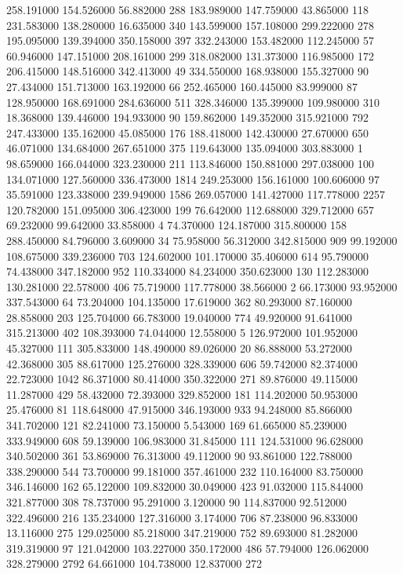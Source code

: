 258.191000	154.526000	56.882000	288
183.989000	147.759000	43.865000	118
231.583000	138.280000	16.635000	340
143.599000	157.108000	299.222000	278
195.095000	139.394000	350.158000	397
332.243000	153.482000	112.245000	57
60.946000	147.151000	208.161000	299
318.082000	131.373000	116.985000	172
206.415000	148.516000	342.413000	49
334.550000	168.938000	155.327000	90
27.434000	151.713000	163.192000	66
252.465000	160.445000	83.999000	87
128.950000	168.691000	284.636000	511
328.346000	135.399000	109.980000	310
18.368000	139.446000	194.933000	90
159.862000	149.352000	315.921000	792
247.433000	135.162000	45.085000	176
188.418000	142.430000	27.670000	650
46.071000	134.684000	267.651000	375
119.643000	135.094000	303.883000	1
98.659000	166.044000	323.230000	211
113.846000	150.881000	297.038000	100
134.071000	127.560000	336.473000	1814
249.253000	156.161000	100.606000	97
35.591000	123.338000	239.949000	1586
269.057000	141.427000	117.778000	2257
120.782000	151.095000	306.423000	199
76.642000	112.688000	329.712000	657
69.232000	99.642000	33.858000	4
74.370000	124.187000	315.800000	158
288.450000	84.796000	3.609000	34
75.958000	56.312000	342.815000	909
99.192000	108.675000	339.236000	703
124.602000	101.170000	35.406000	614
95.790000	74.438000	347.182000	952
110.334000	84.234000	350.623000	130
112.283000	130.281000	22.578000	406
75.719000	117.778000	38.566000	2
66.173000	93.952000	337.543000	64
73.204000	104.135000	17.619000	362
80.293000	87.160000	28.858000	203
125.704000	66.783000	19.040000	774
49.920000	91.641000	315.213000	402
108.393000	74.044000	12.558000	5
126.972000	101.952000	45.327000	111
305.833000	148.490000	89.026000	20
86.888000	53.272000	42.368000	305
88.617000	125.276000	328.339000	606
59.742000	82.374000	22.723000	1042
86.371000	80.414000	350.322000	271
89.876000	49.115000	11.287000	429
58.432000	72.393000	329.852000	181
114.202000	50.953000	25.476000	81
118.648000	47.915000	346.193000	933
94.248000	85.866000	341.702000	121
82.241000	73.150000	5.543000	169
61.665000	85.239000	333.949000	608
59.139000	106.983000	31.845000	111
124.531000	96.628000	340.502000	361
53.869000	76.313000	49.112000	90
93.861000	122.788000	338.290000	544
73.700000	99.181000	357.461000	232
110.164000	83.750000	346.146000	162
65.122000	109.832000	30.049000	423
91.032000	115.844000	321.877000	308
78.737000	95.291000	3.120000	90
114.837000	92.512000	322.496000	216
135.234000	127.316000	3.174000	706
87.238000	96.833000	13.116000	275
129.025000	85.218000	347.219000	752
89.693000	81.282000	319.319000	97
121.042000	103.227000	350.172000	486
57.794000	126.062000	328.279000	2792
64.661000	104.738000	12.837000	272
